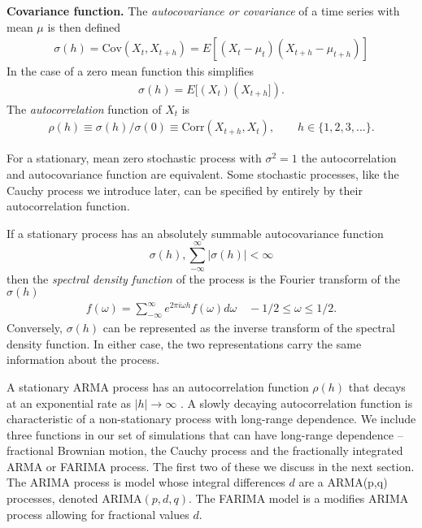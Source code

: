   \begin{defn}{\textbf{Covariance function.}} 
  \label{eq:auto_covariance}
  The  \textit{autocovariance or covariance} of a time series with mean $\mu$ 
  is then defined
  \begin{align*}
    \sigma(h) = \text{Cov}(X_{t}, X_{t + h})
                = E[(X_{t}-\mu_t)(X_{t + h} - \mu_{t + h})]  
   \end{align*}
   In the case of a zero mean function this simplifies
   \begin{align*}
      \sigma(h) = E[(X_{t})(X_{t + h}]).  
   \end{align*}
    The \textit{autocorrelation} function of $X_t$ is
    \begin{align*}
       \rho(h) \equiv \sigma(h)/\sigma(0) \equiv \text{Corr}(X_{t + h}, X_t), 
       \hspace{2em} h \in \{ 1,2,3,... \}.
     \end{align*} 
  \end{defn} 
  For a stationary, mean zero stochastic process with 
  $\sigma^2 = 1$ the autocorrelation and autocovariance function 
   are equivalent. Some stochastic
  processes, like the Cauchy process we introduce later, 
  can be specified by entirely by their autocorrelation function. 
  
  If a stationary process has an absolutely summable 
  autocovariance function
  \[
  \sigma(h), \sum_{-\infty}^{\infty}|\sigma(h)| < \infty
  \] then the
   \textit{spectral density function} of the process 
   is the Fourier transform of the $\sigma(h)$
   \begin{align}
      f(\omega) =  \sum_{-\infty}^{\infty} e^{2 \pi i \omega h} f(\omega)d \omega \hspace{1em}  -1/2 \leq \omega \leq 1/2.
    \end{align}
  Conversely, $\sigma(h)$ can be represented as
   the inverse transform of 
  the spectral density function. In either case, the two 
  representations carry the same information about the process.

  A stationary ARMA process has an autocorrelation  
  function $\rho(h)$ that decays at an exponential rate 
  as $|h| \to \infty$ \cite{fan2003}. A slowly decaying 
  autocorrelation function is characteristic of 
  a non-stationary process with long-range dependence. 
  We include three functions in our set of simulations that can have long-range dependence -- fractional Brownian motion, the Cauchy process and the fractionally integrated ARMA or FARIMA process. 
  The first two of these we discuss in the next section. 
  The ARIMA process is model whose integral 
  differences $d$ are a ARMA(p,q) processes,
  denoted ARIMA$(p,d,q)$.  
  The FARIMA model is a modifies ARIMA process
  allowing for fractional values $d$\cite{fan2003}.

